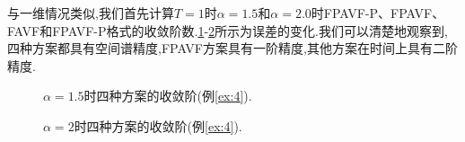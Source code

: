 与一维情况类似,我们首先计算$T=1$时$\alpha=1.5$和$\alpha=2.0$时FPAVF-P、FPAVF、FAVF和FPAVF-P格式的收敛阶数.\ref{fig:7}-\ref{fig:8}所示为误差的变化.我们可以清楚地观察到,四种方案都具有空间谱精度,FPAVF方案具有一阶精度,其他方案在时间上具有二阶精度.
\begin{figure}[H]
\begin{center}
\caption{$\alpha=1.5$时四种方案的收敛阶(例\ref{ex:4}).} \label{fig:7}
\end{center}
\end{figure}

\begin{figure}[H]
\begin{center}
\caption{$\alpha=2$时四种方案的收敛阶(例\ref{ex:4}).} \label{fig:8}
\end{center}
\end{figure}


